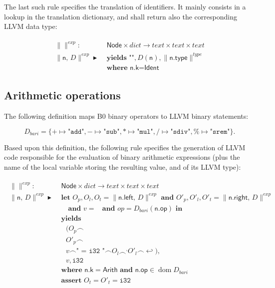 \documentclass{article}
\newcommand{\trad}[2]{\ensuremath{\lVert \textsf{#1} \rVert^{\textit{#2}}}}
\newcommand{\nl}[0]{\ensuremath{\hookleftarrow}}
\DeclareMathOperator{\conc}{\smallfrown}
\DeclareMathOperator{\isdef}{\blacktriangleright}
\DeclareMathOperator{\dom}{\mbox{dom}}
\DeclareMathOperator{\name}{\mathcal{L}()}
\begin{document}
The last such rule specifies the translation of identifiers. It mainly
consists in a lookup in the translation dictionary, and shall return
also the corresponding LLVM data type:

\begin{framed}
\begin{align}
\begin{split}
  \trad{}{exp} : & \textsf{ Node} \times dict \rightarrow text \times text \times  text\\
  \trad{n, $D$}{exp} \isdef & \textbf{ yields } \texttt{""}, D(\textsf{n}), \trad{n.type}{type} \\
  & \textbf{ where } \textsf{n.k} = \textsf{Ident}
\end{split}
\end{align}
\end{framed}

\subsection{Arithmetic operations}
\label{sec:arith}

The following definition maps B0 binary operators to LLVM binary statements:

$$D_{bari} = \{ + \mapsto \texttt{"add"}, 
- \mapsto \texttt{"sub"}, * \mapsto \texttt{"mul"}, / \mapsto
\texttt{"sdiv"}, \% \mapsto \texttt{"srem"} \}.$$

Based upon this definition, the following rule specifies the
generation of LLVM code responsible for the evaluation of binary
arithmetic expressions (plus the name of the local variable storing
the resulting value, and of its LLVM type):
\begin{framed}
\begin{align}
\begin{split}
  \trad{}{exp} : & \textsf{ Node} \times dict  \rightarrow text \times text \times  text\\
  \trad{n, $D$}{exp} \isdef & \textbf{ let } O_p, O_l, O_t =
  \trad{n.left, $D$}{exp} \textbf{ and }
  O'_p, O'_l, O'_t = \trad{n.right, $D$}{exp} \\
  & \quad \textbf{ and } v = \name \textbf{ and } op = D_{bari}(\textsf{n.op}) \textbf{ in } \\
  & \textbf{ yields} \\
  & \quad (O_p \conc \\
  & \quad O'_p \conc \\
  & \quad v \conc \texttt{" = i32 "} \conc O_l \conc^, O'_l \conc \nl), \\
  & \quad v, \texttt{i32} \\
  & \textbf{ where } \textsf{n.k} = \textsf{Arith} \textbf{ and } \textsf{n.op} \in \dom D_{bari} \\
  & \textbf{ assert } O_t = O'_t = \texttt{i32}
\end{split}
\end{align}
\end{framed}
\end{document}
